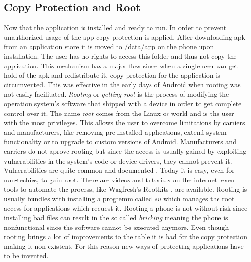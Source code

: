 \subsection{Copy Protection and Root} \label{subsection:android-copyroot}
Now that the application is installed and ready to run.
In order to prevent unauthorized usage of the app copy protection is applied.
After downloading \gls{apk} from an application store it is moved to /data/app on the phone upon installation.
The user has no rights to access this folder and thus not copy the application.
This mechanism has a major flow since when a single user can get hold of the \gls{apk} and redistribute it, copy protection for the application is circumvented.
This was effective in the early days of Android when rooting was not easily facilitated.
\newline
\textit{Rooting} or \textit{getting root} is the process of modifying the operation system's software that shipped with a device in order to get complete control over it.
The name \textit{root} comes from the Linux \gls{os} world and is the user with the most privileges.
This allows the user to overcome limitations by carriers and manufacturers, like removing pre-installed applications, extend system functionality or to upgrade to custom versions of Android.
Manufacturers and carriers do not aprove rooting but since the access is usually gained by exploiting vulnerabilities in the system's code or device drivers, they cannot prevent it.
Vulnerabilities are quite common and documented \cite{androidVul}.
Today it is easy, even for non-techies, to gain root.
There are videos and tutorials on the internet, even tools to automate the process, like Wugfresh's Rootkits \cite{wugfresh}, are available.
Rooting is usually bundles with installing a progremm called \textit{su} which manages the root access for applications which request it.
Rooting a phone is not without risk since installing bad files can result in the so called \textit{bricking} meaning the phone is nonfunctional since the software cannot be executed anymore.\cite{androidpoliceRoot}
\newline
Even though rooting brings a lot of improvements to the table it is bad for the copy protection making it non-existent. For this reason new ways of protecting applications have to be invented.
